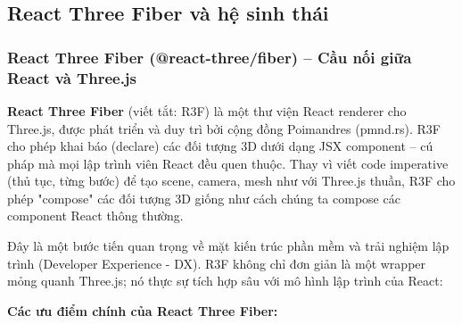 \subsection{React Three Fiber và hệ sinh thái}

\subsubsection{React Three Fiber (@react-three/fiber) – Cầu nối giữa React và Three.js}

\textbf{React Three Fiber} (viết tắt: R3F) là một thư viện React renderer cho Three.js, được phát triển và duy trì bởi cộng đồng Poimandres (pmnd.rs). R3F cho phép khai báo (declare) các đối tượng 3D dưới dạng JSX component – cú pháp mà mọi lập trình viên React đều quen thuộc. Thay vì viết code imperative (thủ tục, từng bước) để tạo scene, camera, mesh như với Three.js thuần, R3F cho phép "compose" các đối tượng 3D giống như cách chúng ta compose các component React thông thường.

Đây là một bước tiến quan trọng về mặt kiến trúc phần mềm và trải nghiệm lập trình (Developer Experience - DX). R3F không chỉ đơn giản là một wrapper mỏng quanh Three.js; nó thực sự tích hợp sâu với mô hình lập trình của React:

\textbf{Các ưu điểm chính của React Three Fiber:}

